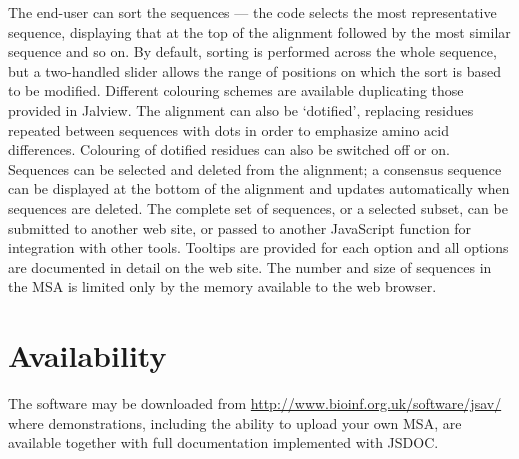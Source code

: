 \documentclass[a4]{article}
\begin{document}
The end-user can sort the sequences --- the code selects the most
representative sequence, displaying that at the top of the alignment
followed by the most similar sequence and so on. By default, sorting
is performed across the whole sequence, but a two-handled slider
allows the range of positions on which the sort is based to be
modified. Different colouring schemes are available duplicating those
provided in Jalview. The alignment can also be `dotified', replacing
residues repeated between sequences with dots in order to emphasize
amino acid differences. Colouring of dotified residues can also be
switched off or on. Sequences can be selected and deleted from the
alignment; a consensus sequence can be displayed at the bottom of the
alignment and updates automatically when sequences are deleted. The
complete set of sequences, or a selected subset, can be submitted to
another web site, or passed to another JavaScript function for
integration with other tools. Tooltips are provided for each option
and all options are documented in detail on the web site. The number
and size of sequences in the MSA is limited only by the memory
available to the web browser.

\section{Availability}
The software may be downloaded from
\url{http://www.bioinf.org.uk/software/jsav/} where demonstrations,
including the ability to upload your own MSA, are available together
with full documentation implemented with JSDOC.


\end{document}
